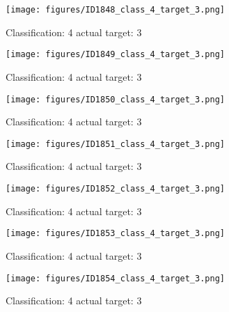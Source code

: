 \begin{figure}[h!]
\begin{center}
\texttt{[image: figures/ID1848\_class\_4\_target\_3.png]}
\end{center}
\caption{ Classification: 4 actual target: 3}
\label{fig:ID1848_class_4_target_3}
\end{figure}
\begin{figure}[h!]
\begin{center}
\texttt{[image: figures/ID1849\_class\_4\_target\_3.png]}
\end{center}
\caption{ Classification: 4 actual target: 3}
\label{fig:ID1849_class_4_target_3}
\end{figure}
\begin{figure}[h!]
\begin{center}
\texttt{[image: figures/ID1850\_class\_4\_target\_3.png]}
\end{center}
\caption{ Classification: 4 actual target: 3}
\label{fig:ID1850_class_4_target_3}
\end{figure}
\begin{figure}[h!]
\begin{center}
\texttt{[image: figures/ID1851\_class\_4\_target\_3.png]}
\end{center}
\caption{ Classification: 4 actual target: 3}
\label{fig:ID1851_class_4_target_3}
\end{figure}
\begin{figure}[h!]
\begin{center}
\texttt{[image: figures/ID1852\_class\_4\_target\_3.png]}
\end{center}
\caption{ Classification: 4 actual target: 3}
\label{fig:ID1852_class_4_target_3}
\end{figure}
\begin{figure}[h!]
\begin{center}
\texttt{[image: figures/ID1853\_class\_4\_target\_3.png]}
\end{center}
\caption{ Classification: 4 actual target: 3}
\label{fig:ID1853_class_4_target_3}
\end{figure}
\begin{figure}[h!]
\begin{center}
\texttt{[image: figures/ID1854\_class\_4\_target\_3.png]}
\end{center}
\caption{ Classification: 4 actual target: 3}
\label{fig:ID1854_class_4_target_3}
\end{figure}
